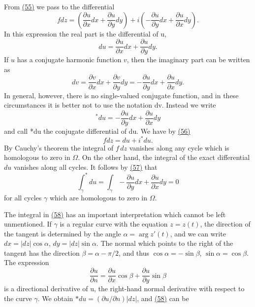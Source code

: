 From \hyperref[eq:4.55]{(55)} we pass to the differential
\begin{equation*}
f d z = \left(\frac {\partial u}{\partial x} d x + \frac {\partial u}{\partial y} d y\right) + i \left(- \frac {\partial u}{\partial y} d x + \frac {\partial u}{\partial x} d y\right).\tag{56}\label{eq:4.56}
\end{equation*}
In this expression the real part is the differential of u,
\begin{equation*}
d u = \frac {\partial u}{\partial x} d x + \frac {\partial u}{\partial y} d y.
\end{equation*}
If $u$ has a conjugate harmonic function $v$, then the imaginary part can be written as
\begin{equation*}
d v = \frac {\partial v}{\partial x} d x + \frac {\partial v}{\partial y} d y = - \frac {\partial u}{\partial y} d x + \frac {\partial u}{\partial x} d y.
\end{equation*}
In general, however, there is no single-valued conjugate function, and in these circumstances it is better not to use the notation dv. Instead we write
\begin{equation*}
^ {*} d u = - \frac {\partial u}{\partial y} d x + \frac {\partial u}{\partial x} d y
\end{equation*}
and call *du the conjugate differential of du. We have by \hyperref[eq:4.56]{(56)}
\begin{equation*}
f d z = d u + i ^ {*} d u.\tag{57}\label{eq:4.57}
\end{equation*}
By Cauchy's theorem the integral of $f \, dz$ vanishes along any cycle which is homologous to zero in $\Omega$. On the other hand, the integral of the exact differential $du$ vanishes along all cycles. It follows by \hyperref[eq:4.57]{(57)} that
\begin{equation*}
\int_ {\gamma} ^ {*} d u = \int_ {\gamma} - \frac {\partial u}{\partial y} d x + \frac {\partial u}{\partial x} d y = 0\tag{58}\label{eq:4.58}
\end{equation*}
for all cycles $\gamma$ which are homologous to zero in $\Omega$.

The integral in \hyperref[eq:4.58]{(58)} has an important interpretation which cannot be left unmentioned. If $\gamma$ is a regular curve with the equation $z = z(t)$, the direction of the tangent is determined by the angle $\alpha = \arg z'(t)$, and we can write $dx = |dz| \cos \alpha$, $dy = |dz| \sin \alpha$. The normal which points to the right of the tangent has the direction $\beta = \alpha - \pi/2$, and thus $\cos \alpha = -\sin \beta$, $\sin \alpha = \cos \beta$. The expression
\begin{equation*}
\frac {\partial u}{\partial n} = \frac {\partial u}{\partial x} \cos \beta + \frac {\partial u}{\partial y} \sin \beta
\end{equation*}
is a directional derivative of u, the right-hand normal derivative with respect to the curve $\gamma$. We obtain $*du = (\partial u/\partial n) |dz|$, and \hyperref[eq:4.58]{(58)} can be


